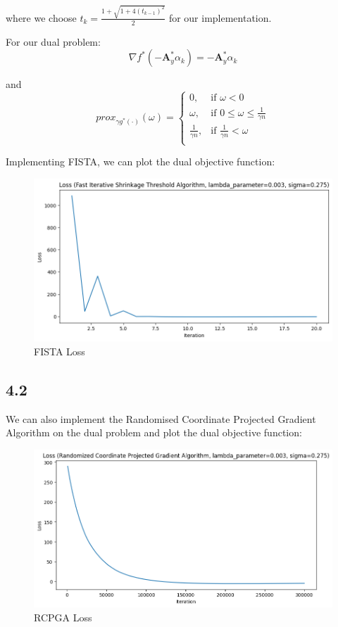 \documentclass[12pt]{article}
\begin{document}
where we choose $t_k = \frac{1+\sqrt{1+ 4 (t_{k-1})^2}}{2}$ for our implementation.

For our dual problem:
\[\nabla f^*(-\textbf{A}_y^* \alpha_{k}) = -\textbf{A}_y^* \alpha_{k}\]

and
\[prox_{\gamma g^*(\cdot)}(\omega) = \begin{cases}
      0, &  \text{if } \omega < 0\\
      \omega, &  \text{if } 0 \leq \omega \leq \frac{1}{\gamma n} \\
      \frac{1}{\gamma n}, & \text{if } \frac{1}{\gamma n} < \omega \\
   \end{cases}\]

Implementing FISTA, we can plot the dual objective function:
\begin{figure}[h]
\centering
\includegraphics[scale=0.35]{outputs/part_4/fista-loss}
\caption{FISTA Loss}
\label{fig:}
\end{figure}
\subsection*{4.2}
We can also implement the Randomised Coordinate Projected Gradient Algorithm on the dual problem and plot the dual objective function:
\begin{figure}[h]
\centering
\includegraphics[scale=0.35]{outputs/part_4/rcpga-loss}
\caption{RCPGA Loss}
\label{fig:}
\end{figure}
\newpage
\end{document}
